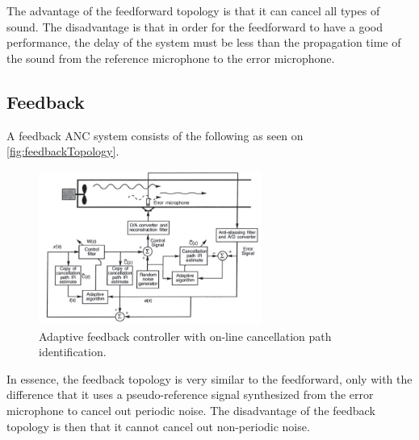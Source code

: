 The advantage of the feedforward topology is that it can cancel all types of sound. The disadvantage is that in order for the feedforward to have a good performance, the delay of the system must be less than the propagation time of the sound from the reference microphone to the error microphone.    




\subsection*{Feedback}
A feedback ANC system consists of the following as seen on \autoref{fig:feedbackTopology}.
\begin{figure}[H]
	\centering
	\includegraphics[width=0.65\textwidth]{figures/BasicSystem/feedback}
	\caption{Adaptive feedback controller with on-line cancellation path identification.}
	\label{fig:feedbackTopology}
\end{figure}

In essence, the feedback topology is very similar to the feedforward, only with the difference that it uses a pseudo-reference signal synthesized from the error microphone to cancel out periodic noise. The disadvantage of the feedback topology is then that it cannot cancel out non-periodic noise.    



